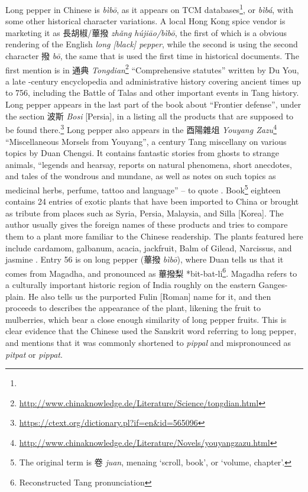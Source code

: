 Long pepper in Chinese is  \textit{bìbō}, as it appears on TCM databases\footnote{}, or  \textit{bìbá}, with some other historical character variations. A local Hong Kong spice vendor is marketing it as 長胡椒/蓽撥 \textit{zhǎng hújiāo/bìbō}, the first of which is a obvious rendering of the English \textit{long [black] pepper}, while the second is using the second character 撥 \textit{bō}, the same that is used the first time in historical documents. The first mention is in 通典 \textit{Tongdian}\footnote{\url{http://www.chinaknowledge.de/Literature/Science/tongdian.html}} ``Comprehensive statutes'' written by Du You, a late -century encyclopedia and administrative history covering ancient times up to 756, including the Battle of Talas and other important events in Tang history. Long pepper appears in the last part of the book about ``Frontier defense'', under the section 波斯 \textit{Bosi} [Persia], in a listing all the products that are supposed to be found there.\footnote{\url{https://ctext.org/dictionary.pl?if=en&id=565096}} Long pepper also appears in the 酉陽雜俎 \textit{Youyang Zazu}\footnote{\url{http://www.chinaknowledge.de/Literature/Novels/youyangzazu.html}} ``Miscellaneous Morsels from Youyang'', a  century Tang miscellany on various topics by Duan Chengsi. It contains fantastic stories from ghosts to strange animals, ``legends and hearsay, reports on natural phenomena, short anecdotes, and tales of the wondrous and mundane, as well as notes on such topics as medicinal herbs, perfume, tattoo and language'' -- to quote \textcite[1]{reed_youyang_1995}. Book\footnote{The original term is 卷 \textit{juan}, menaing `scroll, book', or `volume, chapter'.} eighteen contains 24 entries of exotic plants that have been imported to China or brought as tribute from places such as Syria, Persia, Malaysia, and Silla [Korea]. The author usually gives the foreign names of these products and tries to compare them to a plant more familiar to the Chinese readership. The plants featured here include cardamom, galbanum, acacia, jackfruit, Balm of Gilead, Narcissus, and jasmine \parencite[68]{reed_youyang_1995}. Entry 56 is on long pepper (蓽撥 \textit{bìbō}), where Duan tells us that it comes from Magadha, and pronounced as 蓽撥梨 *bit-bat-li\footnote{Reconstructed Tang pronunciation}. Magadha refers to a culturally important historic region of India roughly on the eastern Ganges-plain. He also tells us the purported Fulin [Roman] name for it, and then proceeds to describes the appearance of the plant, likening the fruit to mulberries, which bear a close enough similarity of long pepper fruits. This is clear evidence that the Chinese used the Sanskrit word referring to long pepper, and \textcite[151]{schafer_golden_1985} mentions that it was commonly shortened to \textit{pippal} and mispronounced as \textit{pitpat} or \textit{pippat}. 

